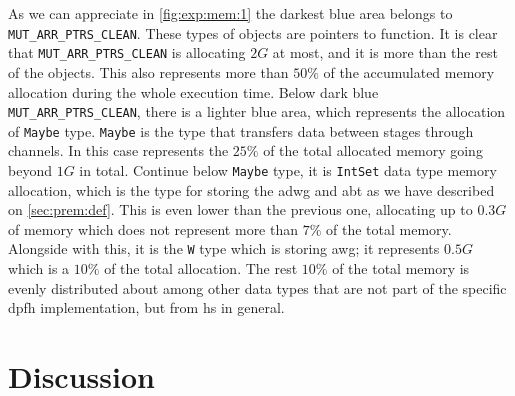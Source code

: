 As we can appreciate in \autoref{fig:exp:mem:1} the darkest blue area belongs to \texttt{MUT\_ARR\_PTRS\_CLEAN}. These types of objects are pointers to function.
It is clear that \texttt{MUT\_ARR\_PTRS\_CLEAN} is allocating $2G$ at most, and it is more than the rest of the objects. This also represents more than $50\%$ of the accumulated memory allocation during the whole execution time.
Below dark blue \texttt{MUT\_ARR\_PTRS\_CLEAN}, there is a lighter blue area, which represents the allocation of \texttt{Maybe} type. \texttt{Maybe} is the type that transfers data between stages through channels. In this case represents the $25\%$ of the total allocated memory going beyond $1G$ in total.
Continue below \texttt{Maybe} type, it is \texttt{IntSet} data type memory allocation, which is the type for storing the \acrshort{adwg} and \acrshort{abt} as we have described on \autoref{sec:prem:def}. This is even lower than the previous one, allocating up to $0.3G$ of memory which does not represent more than $7\%$ of the total memory. 
Alongside with this, it is the \texttt{W} type which is storing \acrshort{awg}; it represents $0.5G$ which is a $10\%$ of the total allocation.
The rest $10\%$ of the total memory is evenly distributed about among other data types that are not part of the specific \acrshort{dpfh} implementation, but from \acrshort{hs} in general.
 
\section{Discussion}\label{sec:exp:discussion}
